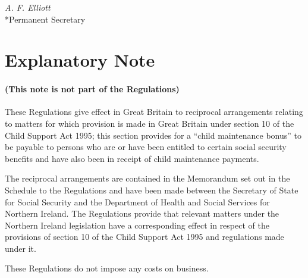 \documentclass[12pt,a4paper]{article}
\begin{document}
{\raggedleft
\emph{A. F. Elliott}\\*Permanent Secretary

}

\part{Explanatory Note}

\renewcommand\parthead{--- Explanatory Note}

\subsection*{(This note is not part of the Regulations)}

These Regulations give effect in Great Britain to reciprocal arrangements relating to matters for which provision is made in Great Britain under section 10 of the Child Support Act 1995; this section provides for a “child maintenance bonus” to be payable to persons who are or have been entitled to certain social security benefits and have also been in receipt of child maintenance payments.

  The reciprocal arrangements are contained in the Memorandum set out in the Schedule to the Regulations and have been made between the Secretary of State for Social Security and the Department of Health and Social Services for Northern Ireland. The Regulations provide that relevant matters under the Northern Ireland legislation have a corresponding effect in respect of the provisions of section 10 of the Child Support Act 1995 and regulations made under it.

  These Regulations do not impose any costs on business.
\end{document}
